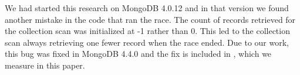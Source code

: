 \begin{comment} Michael: looks good to me
\af{Check my rewording of this}
\end{comment}

We had started this research on MongoDB 4.0.12 and in that version we found another mistake in the code that ran the race. The count of records retrieved for the collection scan was initialized at -1 rather than 0. This led to the collection scan always retrieving one fewer record when the race ended. Due to our work, this bug was fixed in MongoDB 4.4.0 and the fix is included in \mdbver, which we measure in this paper.



